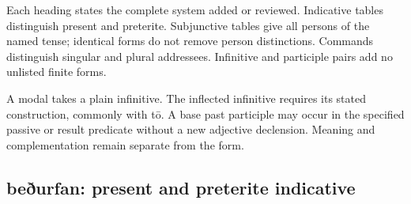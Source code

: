 Each heading states the complete system added or reviewed. Indicative tables distinguish present and preterite. Subjunctive tables give all persons of the named tense; identical forms do not remove person distinctions. Commands distinguish singular and plural addressees. Infinitive and participle pairs add no unlisted finite forms.

A modal takes a plain infinitive. The inflected infinitive requires its stated construction, commonly with tō. A base past participle may occur in the specified passive or result predicate without a new adjective declension. Meaning and complementation remain separate from the form.

\subsection*{beðurfan: present and preterite indicative}

